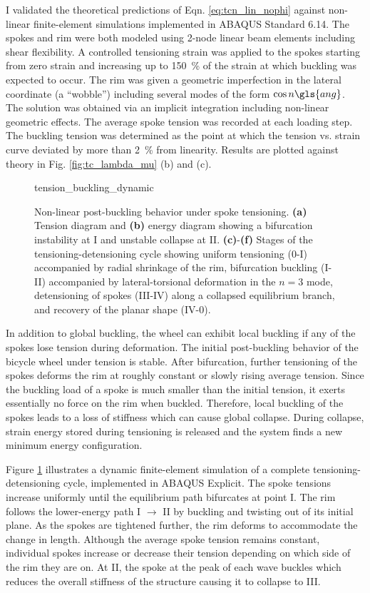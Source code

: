 \documentclass[\rootdir/thesis.tex]{subfiles}
\begin{document}
I validated the theoretical predictions of Eqn. \eqref{eq:tcn_lin_nophi} against non-linear finite-element simulations implemented in ABAQUS Standard 6.14. The spokes and rim were both modeled using 2-node linear beam elements including shear flexibility. A controlled tensioning strain was applied to the spokes starting from zero strain and increasing up to \SI{150}{\percent} of the strain at which buckling was expected to occur. The rim was given a geometric imperfection in the lateral coordinate (a ``wobble'') including several modes of the form $\cos{n\gls{ang}}$. The solution was obtained via an implicit integration including non-linear geometric effects. The average spoke tension was recorded at each loading step. The buckling tension was determined as the point at which the tension vs. strain curve deviated by more than \SI{2}{\percent} from linearity. Results are plotted against theory in Fig. \ref{fig:tc_lambda_mu} (b) and (c).

\begin{figure}
\centering
{tension_buckling_dynamic}
\caption{Non-linear post-buckling behavior under spoke tensioning. \textbf{(a)} Tension diagram and \textbf{(b)} energy diagram showing a bifurcation instability at I and unstable collapse at II. \textbf{(c)}-\textbf{(f)} Stages of the tensioning-detensioning cycle showing uniform tensioning (0-I) accompanied by radial shrinkage of the rim, bifurcation buckling (I-II) accompanied by lateral-torsional deformation in the $n=3$ mode, detensioning of spokes (III-IV) along a collapsed equilibrium branch, and recovery of the planar shape (IV-0).}
\label{fig:tension_buckling_dynamic}
\end{figure}

In addition to global buckling, the wheel can exhibit local buckling if any of the spokes lose tension during deformation. The initial post-buckling behavior of the bicycle wheel under tension is stable. After bifurcation, further tensioning of the spokes deforms the rim at roughly constant or slowly rising average tension. Since the buckling load of a spoke is much smaller than the initial tension, it exerts essentially no force on the rim when buckled. Therefore, local buckling of the spokes leads to a loss of stiffness which can cause global collapse. During collapse, strain energy stored during tensioning is released and the system finds a new minimum energy configuration.

Figure \ref{fig:tension_buckling_dynamic} illustrates a dynamic finite-element simulation of a complete tensioning-detensioning cycle, implemented in ABAQUS Explicit. The spoke tensions increase uniformly until the equilibrium path bifurcates at point I. The rim follows the lower-energy path I $\rightarrow$ II by buckling and twisting out of its initial plane. As the spokes are tightened further, the rim deforms to accommodate the change in length. Although the average spoke tension remains constant, individual spokes increase or decrease their tension depending on which side of the rim they are on. At II, the spoke at the peak of each wave buckles which reduces the overall stiffness of the structure causing it to collapse to III.
\end{document}
